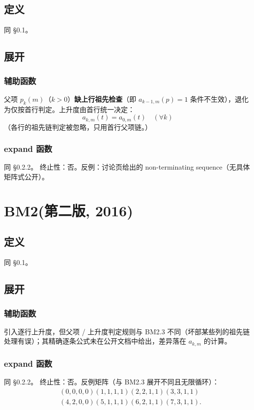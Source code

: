 \documentclass[UTF8]{ctexart}
\begin{document}
\subsection{定义}
同 \S 0.1。

\subsection{展开}
\subsubsection{辅助函数}
父项 $p_k(m)$（$k>0$）\textbf{缺上行祖先检查}（即 $a_{k-1,m}(p)=1$ 条件不生效），退化为仅按首行判定。上升度由首行统一决定：
\[
a_{k,m}(t)=a_{0,m}(t)\quad(\forall k)
\]
（各行的祖先链判定被忽略，只用首行父项链。）

\subsubsection{expand 函数}
同 \S 0.2.2。
终止性：否。反例：讨论页给出的 non-terminating sequence（无具体矩阵式公开）。

\section{BM2(第二版, 2016)}
\subsection{定义}
同 \S 0.1。

\subsection{展开}
\subsubsection{辅助函数}
引入逐行上升度，但父项 / 上升度判定规则与 BM2.3 不同（坏部某些列的祖先链处理有误）；其精确逐条公式未在公开文档中给出，差异落在 $a_{k,m}$ 的计算。

\subsubsection{expand 函数}
同 \S 0.2.2。
终止性：否。反例矩阵（与 BM2.3 展开不同且无限循环）：
\[
\begin{aligned}
&(0,0,0,0)(1,1,1,1)(2,2,1,1)(3,3,1,1)\\
&(4,2,0,0)(5,1,1,1)(6,2,1,1)(7,3,1,1).
\end{aligned}
\]
\end{document}
